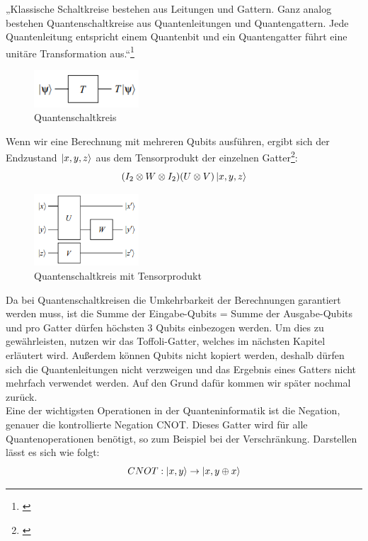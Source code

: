 „Klassische Schaltkreise bestehen aus Leitungen und Gattern.
Ganz analog bestehen Quantenschaltkreise aus Quantenleitungen und Quantengattern.
Jede Quantenleitung entspricht einem Quantenbit und ein Quantengatter führt eine unitäre Transformation aus.“\footnote{\cite[S. 76]{homeister_quantum_2022}}\\
\begin{figure}[H]
    \centering
    \includegraphics[width=0.35\textwidth]{img/Quantengatter Basic}
    \caption{Quantenschaltkreis}
    \label{fig:quantenschaltkreis}
\end{figure}

Wenn wir eine Berechnung mit mehreren Qubits ausführen, ergibt sich der Endzustand $\ket{x, y, z}$ aus dem Tensorprodukt der einzelnen Gatter\footnote{\cite[S. 76]{homeister_quantum_2022}}:
\begin{equation}
    (I_{2} \otimes W \otimes I_{2})(U \otimes V)\ket{x, y, z}
\end{equation}

\begin{figure}[H]
    \centering
    \includegraphics[width=0.35\textwidth]{img/Quantengatter 3er}
    \caption{Quantenschaltkreis mit Tensorprodukt}
    \label{fig:quantenschaltkreis-tensorprodukt}
\end{figure}

Da bei Quantenschaltkreisen die Umkehrbarkeit der Berechnungen garantiert werden muss, ist die Summe der Eingabe-Qubits = Summe der Ausgabe-Qubits und pro Gatter dürfen höchsten 3 Qubits einbezogen werden.
Um dies zu gewährleisten, nutzen wir das Toffoli-Gatter, welches im nächsten Kapitel erläutert wird.
Außerdem können Qubits nicht kopiert werden, deshalb dürfen sich die Quantenleitungen nicht verzweigen und das Ergebnis eines Gatters nicht mehrfach verwendet werden.
Auf den Grund dafür kommen wir später nochmal zurück.\\

Eine der wichtigsten Operationen in der Quanteninformatik ist die Negation, genauer die kontrollierte Negation CNOT\@.
Dieses Gatter wird für alle Quantenoperationen benötigt, so zum Beispiel bei der Verschränkung.
Darstellen lässt es sich wie folgt:
\begin{equation}
    CNOT : \ket{x,y} \rightarrow \ket{x,y\oplus x}
\end{equation}

